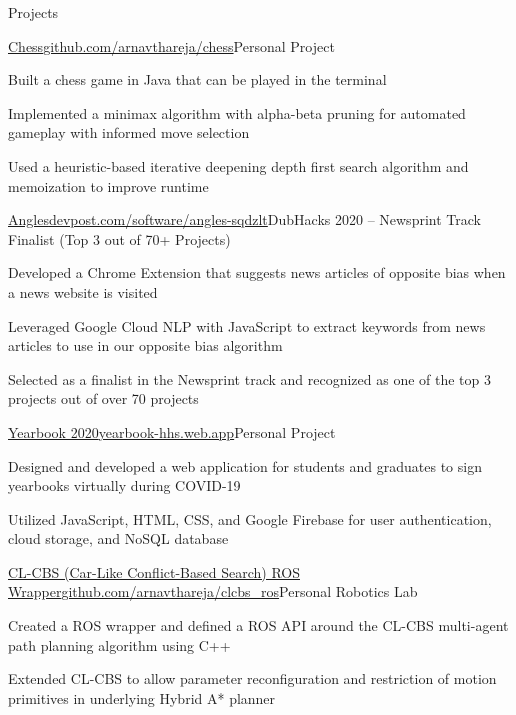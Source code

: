 \documentclass{resume} %
\begin{document}

\begin{rSection}{Projects}

\begin{project}{\href{https://github.com/arnavthareja/chess}{Chess}}{\href{https://github.com/arnavthareja/chess}{github.com/arnavthareja/chess}}{Personal Project}
\item Built a chess game in Java that can be played in the terminal
\item Implemented a minimax algorithm with alpha-beta pruning for automated gameplay with informed move selection
\item Used a heuristic-based iterative deepening depth first search algorithm and memoization to improve runtime
\end{project}

\begin{project}{\href{https://devpost.com/software/angles-sqdzlt}{Angles}}{\href{https://devpost.com/software/angles-sqdzlt}{devpost.com/software/angles-sqdzlt}}{DubHacks 2020 – Newsprint Track Finalist (Top 3 out of 70+ Projects)}
\item Developed a Chrome Extension that suggests news articles of opposite bias when a news website is visited
\item Leveraged Google Cloud NLP with JavaScript to extract keywords from news articles to use in our opposite bias algorithm
\item Selected as a finalist in the Newsprint track and recognized as one of the top 3 projects out of over 70 projects
\end{project}

\begin{project}{\href{https://yearbook-hhs.web.app/}{Yearbook 2020}}{\href{https://yearbook-hhs.web.app/}{yearbook-hhs.web.app}}{Personal Project}
\item Designed and developed a web application for students and graduates to sign yearbooks virtually during COVID-19
\item Utilized JavaScript, HTML, CSS, and Google Firebase for user authentication, cloud storage, and NoSQL database
\end{project}

\begin{project}{\href{https://github.com/arnavthareja/clcbs\_ros}{CL-CBS (Car-Like Conflict-Based Search) ROS Wrapper}}{\href{https://github.com/arnavthareja/clcbs\_ros}{github.com/arnavthareja/clcbs\_ros}}{Personal Robotics Lab}
\item Created a ROS wrapper and defined a ROS API around the CL-CBS multi-agent path planning algorithm using C++
\item Extended CL-CBS to allow parameter reconfiguration and restriction of motion primitives in underlying Hybrid A* planner
\end{project}

\end{rSection}
\end{document}
